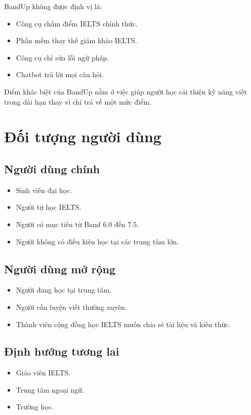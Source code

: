 \documentclass[12pt,a4paper]{article}
\begin{document}
BandUp không được định vị là:

\begin{itemize}
  \item Công cụ chấm điểm IELTS chính thức.
  \item Phần mềm thay thế giám khảo IELTS.
  \item Công cụ chỉ sửa lỗi ngữ pháp.
  \item Chatbot trả lời mọi câu hỏi.
\end{itemize}

Điểm khác biệt của BandUp nằm ở việc giúp người học cải thiện kỹ năng viết trong dài hạn thay vì chỉ trả về một mức điểm.

\section{Đối tượng người dùng}

\subsection{Người dùng chính}

\begin{itemize}
  \item Sinh viên đại học.
  \item Người tự học IELTS.
  \item Người có mục tiêu từ Band 6.0 đến 7.5.
  \item Người không có điều kiện học tại các trung tâm lớn.
\end{itemize}

\subsection{Người dùng mở rộng}

\begin{itemize}
  \item Người đang học tại trung tâm.
  \item Người cần luyện viết thường xuyên.
  \item Thành viên cộng đồng học IELTS muốn chia sẻ tài liệu và kiến thức.
\end{itemize}

\subsection{Định hướng tương lai}

\begin{itemize}
  \item Giáo viên IELTS.
  \item Trung tâm ngoại ngữ.
  \item Trường học.
\end{itemize}
\end{document}
